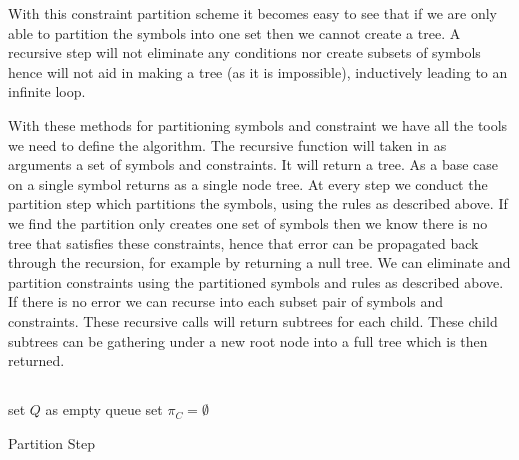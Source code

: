 With this constraint partition scheme it becomes easy to see that if we are only able to partition the symbols into one set then we cannot create a tree.
A recursive step will not eliminate any conditions nor create subsets of symbols hence will not aid in making a tree (as it is impossible), inductively leading to an infinite loop.

With these methods for partitioning symbols and constraint we have all the tools we need to define the  algorithm.
The recursive  function will taken in as arguments a set of symbols and constraints.
It will return a tree. 
As a base case  on a single symbol returns as a single node tree.
At every step we conduct the partition step which partitions the symbols, using the rules as described above.
If we find the partition only creates one set of symbols then we know there is no tree that satisfies these constraints, hence that error can be propagated back through the recursion, for example by returning a null tree.
We can eliminate and partition constraints using the partitioned symbols and rules as described above.
If there is no error we can recurse into each subset pair of symbols and constraints.
These recursive calls will return subtrees for each child. These child subtrees can be gathering under a new root node into a full tree which is then returned.    

\subsection{}
\begin{algorithm}[H]
    \SetAlgoLined
     set $Q$ as empty queue\;
     set $\pi_C = \emptyset$\;
     
    
     \caption{Partition Step}
    \end{algorithm}

